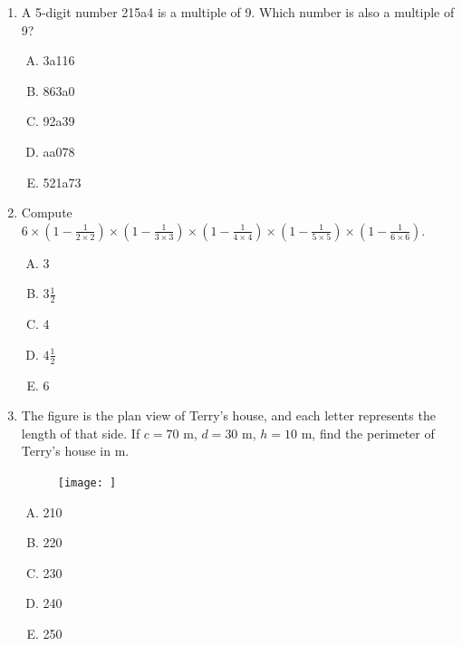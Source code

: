 \documentclass[12pt]{scrartcl}
\begin{document}
\begin{enumerate}
    \item A 5-digit number 215a4 is a multiple of 9. Which number is also a multiple of 9?
    \begin{multicols}{5}
        \begin{enumerate}[(A)]
            \item 3a116
            \item 863a0
            \item 92a39
            \item aa078
            \item 521a73
        \end{enumerate}
    \end{multicols}

    \item Compute $6 \times (1- \frac{1}{2 \times 2}) \times (1- \frac{1}{3 \times 3}) \times (1- \frac{1}{4 \times 4}) \times (1- \frac{1}{5 \times 5}) \times (1- \frac{1}{6 \times 6})$.
    \begin{multicols}{5}
        \begin{enumerate}[(A)]
            \item 3
            \item $3\frac{1}{2}$
            \item 4
            \item $4\frac{1}{2}$
            \item 6
        \end{enumerate}
    \end{multicols}

    \item The figure is the plan view of Terry's house, and each letter represents the length of that side. If $c = 70$ m, $d = 30$ m, $h = 10$ m, find the perimeter of Terry's house in m.
    \begin{figure}[h]
        \centering
        \texttt{[image: ]}
    \end{figure}
    \begin{multicols}{5}
        \begin{enumerate}[(A)]
            \item 210
            \item 220
            \item 230
            \item 240
            \item 250
        \end{enumerate}
    \end{multicols}


\end{enumerate}
\end{document}
